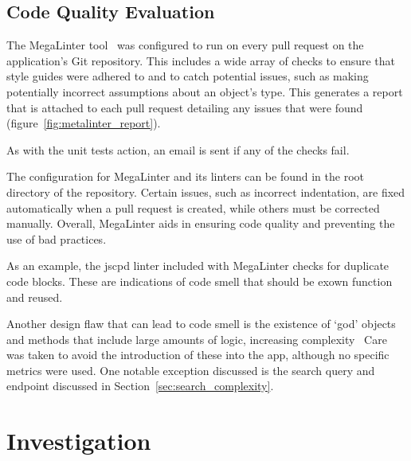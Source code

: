 \subsection{Code Quality Evaluation}
The MegaLinter tool~\cite{vuillamy_megalinter_nodate} was configured to run on every pull request on the application's Git repository. This includes a wide array
of checks to ensure that style guides were adhered to and to catch potential issues, such as making potentially incorrect
assumptions about an object's type. This generates a report that is attached to each pull request detailing
any issues that were found (figure~\ref{fig:metalinter_report}).

As with the unit tests action, an email is sent if any of the checks fail.

The configuration for MegaLinter and its linters can be found in the root directory of the repository.
Certain issues, such as incorrect indentation, are fixed automatically when a pull request is created, while others
must be corrected manually. Overall, MegaLinter aids in ensuring code quality and preventing the use of bad practices.

As an example, the jscpd linter included with MegaLinter checks for duplicate code blocks. These are indications of code
smell that should be exown function and reused.~\cite{fowler_refactoring_1997}

Another design flaw that can lead to code smell is the existence of \enquote*{god} objects
and methods that include large amounts of logic, increasing complexity~\cite{marinescu_measurement_2005,vaucher_tracking_2009}
Care was taken to avoid the introduction of these into the \chef{} app, although no specific
metrics were used. One notable exception discussed is the search query and endpoint discussed in
Section~\ref{sec:search_complexity}.

\section{Investigation}

